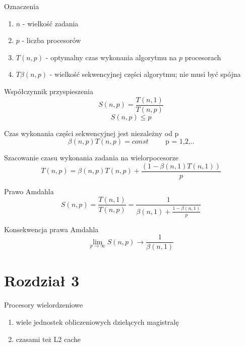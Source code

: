 \documentclass{beamer}
\begin{document}
\begin{frame}{Oznaczenia}
  \begin{enumerate}
  \item $n$ - wielkość zadania
  \item $p$ - liczba procesorów
  \item $T(n,p)$ - optymalny czas wykonania algorytmu na $p$ procesorach
  \item $T\beta(n,p)$ - wielkość sekwencyjnej części algorytmu; nie musi być spójna
  \end{enumerate}
\end{frame}

\begin{frame}{Współczynnik przyspieszenia}
  $$ S(n,p) = \frac{T(n,1)}{T(n,p)} $$
  $$ S(n,p) \leq p$$
\end{frame}

\begin{frame}{Czas wykonania części sekwencyjnej jest niezależny od p}
  $$ \beta(n,p) T(n, p) = const \hspace{1cm}\mbox{p = 1,2,..} $$
\end{frame}

\begin{frame}{Szacowanie czasu wykonania zadania na wielorpocesorze}
  $$ T(n,p) = \beta(n,p) T(n,p) + \frac{(1-\beta(n,1) T(n,1))}{p} $$
\end{frame}


\begin{frame}{Prawo Amdahla}
  $$ S(n,p) = \frac{T(n,1)}{T(n,p)} = \frac{1}{\beta(n,1) + \frac{1 - \beta(n,1)}{p}} $$
\end{frame}

\begin{frame}{Konsekwencja prawa Amdahla}
  $$ \lim_{p \rightarrow \infty}S(n,p) \rightarrow \frac{1}{\beta(n,1)} $$
\end{frame}
\section{Rozdział 3}


\begin{frame}{Procesory wielordzeniowe}
  \begin{enumerate}
  \item wiele jednostek obliczeniowych dzielących magistralę
  \item czasami też L2 cache
  \end{enumerate}
\end{frame}
\end{document}
